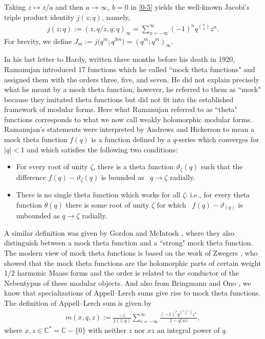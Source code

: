 \documentclass[10pt,a4paper]{amsart}
\numberwithin{equation}{section}
\begin{document}
Taking $z\mapsto z/a$ and then $a\rightarrow\infty$, $b=0$ in \eqref{0-5} yields the well-known Jacobi's triple product identity $j(z;q)$, namely,
\begin{align*}
j(z;q):=(z,q/z,q;q)_{\infty}=\sum_{n=-\infty}^{\infty}(-1)^nq^{n\choose2}z^n.
\end{align*}
For brevity, we define $J_m:=j\bigl(q^m;q^{3m}\bigr)=(q^m;q^m)_\infty$.


In his last letter to Hardy, written three months before his death in 1920, Ramanujan \cite{R} introduced 17 functions which he called ``mock theta functions" and assigned them with the orders three, five, and seven. He did not explain precisely what he meant by a mock theta function, however, he referred to them as ``mock" because they imitated theta functions but did not fit into the established framework of modular forms. Here what Ramanujan referred to as ``theta" functions corresponds to what we now call weakly holomorphic modular forms. Ramanujan's
statements were interpreted by Andrews and Hickerson \cite{AH} to mean a mock theta function $f(q)$ is a function defined by a $q$-series which converges for $|q| < 1$ and which satisfies the following two conditions:
\begin{itemize}\itemsep=0pt
\item[(0)] For every root of unity $\zeta$, there is a theta function $\vartheta_\zeta(q)$ such that
 the difference $f(q)-\vartheta_\zeta(q)$ is bounded as ~$q\rightarrow\zeta$ radially.

\item[(1)] There is no single theta function which works for all $\zeta$: i.e., for every
 theta function $\theta(q)$ there is some root of unity $\zeta$ for which ~$f(q)-\vartheta_(q)$ is
 unbounded as $q\rightarrow\zeta$ radially.
\end{itemize}
A similar definition was given by Gordon and McIntosh \cite{GM1,GM}, where they
also distinguish between a mock theta function and a ``strong" mock theta function.
The modern view of mock theta functions is based on the work of Zwegers \cite{Z,Z1},
who showed that the mock theta functions are the holomorphic parts of certain weight 1/2 harmonic Maass forms and the order is related to the conductor of the Nebentypus of these modular objects. And also from Bringmann and Ono \cite{BO1,BO2}, we know that specializations of Appell--Lerch sums give rise to mock theta functions. The definition of Appell--Lerch sum is given by
\begin{align*}%
m(x,q,z):=\frac{-z}{j(z;q)}\sum_{r=-\infty}^{\infty}
\frac{(-1)^{r}q^{r+1\choose 2}z^r}{1-q^rxz},
\end{align*}
where $x,z\in\mathbb{C}^{*}=\mathbb{C}-\{0\}$ with neither $z$ nor $xz$ an integral power of $q$.
\end{document}
